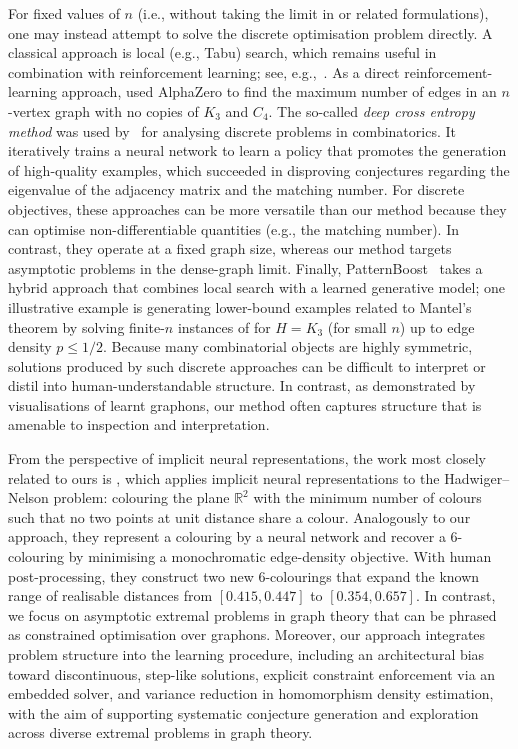 \documentclass{article}
\theoremstyle{plain}
\theoremstyle{definition}
\theoremstyle{remark}
\begin{document}
For fixed values of $n$ (i.e., without taking the limit in  or related formulations), one may instead attempt to solve the discrete optimisation problem directly. A classical approach is local (e.g., Tabu) search, which remains useful in combination with reinforcement learning; see, e.g.,~\citet{parczyk2025new,mehrabian2024finding}.
As a direct reinforcement-learning approach, \citet{mehrabian2024finding} used {\sc AlphaZero} to find the maximum number of edges in an $n$-vertex graph with no copies of $K_3$ and $C_4$.
The so-called \emph{deep cross entropy method} was used by~\citet{wagner2021constructions} for analysing discrete problems in combinatorics. It iteratively trains a neural network to learn a policy that promotes the generation of high-quality examples, which succeeded in disproving conjectures regarding the eigenvalue of the adjacency matrix and the matching number.
For discrete objectives, these approaches can be more versatile than our method because they can optimise non-differentiable quantities (e.g., the matching number). In contrast, they operate at a fixed graph size, whereas our method targets asymptotic problems in the dense-graph limit.
Finally, {\sc PatternBoost}~\citep{charton2024patternboost} takes a hybrid approach that combines local search with a learned generative model; one illustrative example is generating lower-bound examples related to Mantel's theorem by solving finite-$n$ instances of  for $H=K_3$ (for small $n$) up to edge density $p \le 1/2$.
Because many combinatorial objects are highly symmetric, solutions produced by such discrete approaches can be difficult to interpret or distil into human-understandable structure. 
In contrast, as demonstrated by visualisations of learnt graphons, our method often captures structure that is amenable to inspection and interpretation.

From the perspective of implicit neural representations, the work most closely related to ours is \citet{mundinger2025neural}, which applies implicit neural representations to the Hadwiger--Nelson problem: colouring the plane $\mathbb{R}^2$ with the minimum number of colours such that no two points at unit distance share a colour. Analogously to our approach, they represent a colouring by a neural network and recover a 6-colouring by minimising a monochromatic edge-density objective. With human post-processing, they construct two new 6-colourings that expand the known range of realisable distances from $[0.415, 0.447]$ to $[0.354, 0.657]$. In contrast, we focus on asymptotic extremal problems in graph theory that can be phrased as constrained optimisation over graphons. Moreover, our approach integrates problem structure into the learning procedure, including an architectural bias toward discontinuous, step-like solutions, explicit constraint enforcement via an embedded solver, and variance reduction in homomorphism density estimation, with the aim of supporting systematic conjecture generation and exploration across diverse extremal problems in graph theory.
\end{document}
